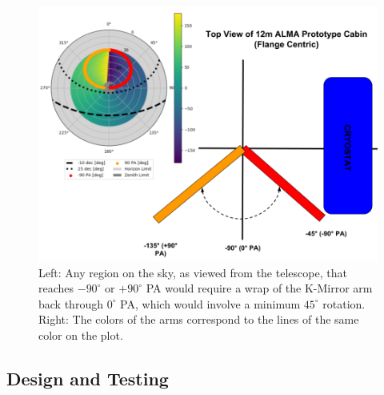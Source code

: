 \documentclass[manuscript]{aastex}
\begin{document}
\begin{figure}[ht!]
	\centering
	\includegraphics[width=\textwidth]{km45.png}%
	\caption[Parallactic Angle Graphs to Determine Zenith Positions]{Left: Any region on the sky, as viewed from the telescope, that reaches $-90^{\circ}$ or $+90^{\circ}$ PA would require a wrap of the K-Mirror arm back through $0^{\circ}$ PA, which would involve a minimum $45^{\circ}$ rotation. Right: The colors of the arms correspond to the lines of the same color on the plot. }%
	\label{fig:km45}%
\end{figure}

\subsection{Design and Testing}
\end{document}
